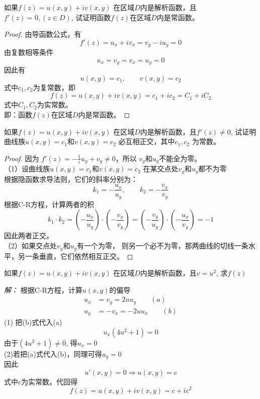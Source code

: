  \begin{example}
    如果$f(z) =u(x,y ) + i v(x,y) $ 在区域$D$内是解析函数，且$f'(z) = 0, (z \in D) $, 试证明函数$f(z)$在区域$D$内是常函数。
 \end{example}
    \begin{proof}
    由导函数公式，有
    \[ f'(z) = u_x + i v_x = v_y - i u_y =0\]
    由复数相等条件
    \[ u_x = v_y = v_x = u_y =0\]
    因此有
    \[ u(x,y) = c_1, \qquad v(x,y) =c_2\]
    式中$c_1, c_2$为复常数，即
    \[ f(z) = u(x,y) + iv(x,y) = c_1 + i c_2 = C_1 + iC_2\]
    式中$C_1, C_2$为实常数。\\
    即：函数$f(z)$在区域$D$内是常函数。
    \end{proof}
 \begin{example}
    如果$f(z) =u(x,y ) + i v(x,y) $ 在区域$D$内是解析函数，且$f'(z) \ne 0 $, 试证明曲线族$u(x,y)=c_1$和$v(x,y) = c_2$ 必互相正交，其中$c_1, c_2$ 为常数。
 \end{example}
    \begin{proof}
        因为 $f'(z) = -\frac{1}{i}u_y + v_y \ne 0 $，所以 $v_y$和$u_y$不能全为零。\\
        （1）设曲线族$u(x,y)=c_1$和$v(x,y) = c_2$ 在某交点处$v_y$和$u_y$都不为零 \\
        根据隐函数求导法则，它们的斜率分别为：
         \[ k_1 = - \frac{u_x}{u_y}, \qquad k_2 = - \frac{v_x}{v_y}\]
        根据C-R方程，计算两者的积
        \[ k_1\cdot k_2 = \left(- \frac{u_x}{u_y}\right) \cdot \left(- \frac{v_x}{v_y}\right) = \left(- \frac{v_y}{u_y}\right) \cdot \left(- \frac{u_x}{v_y}\right) =-1\]
        因此两者正交。\\
        （2）如果交点处$v_y$和$u_y$有一个为零， 则另一个必不为零，那两曲线的切线一条水平，另一条垂直，它们依然相互正交。
    \end{proof}
\begin{example}
        如果$f(z) =u(x,y ) + i v(x,y) $ 在区域$D$内是解析函数，且$v= u^2 $, 求$f(z)$
\end{example}   
\emph{解：} 根据C-R方程，计算$u(x,y)$的偏导 
    \[\begin{aligned}
        u_x &= v_y = 2u u_y  \qquad (a)\\
        u_y &= -v_x = -2u u_x \qquad (b)
    \end{aligned}\]
    (1) 把(b)式代入(a)
    \[ u_x (4u^2 +1) =0\]
    由于$(4u^2 +1) \ne 0$, 得$u_x =0$ \\
    (2)若把(a)式代入(b)，同理可得$u_y =0$ \\
    因此 
    \[ u'(x,y) = 0 \Rightarrow u(x,y)=c\]
    式中$c$为实常数。代回得 
    \[ f(z) =u(x,y ) + i v(x,y) = c+ ic^2 \]


